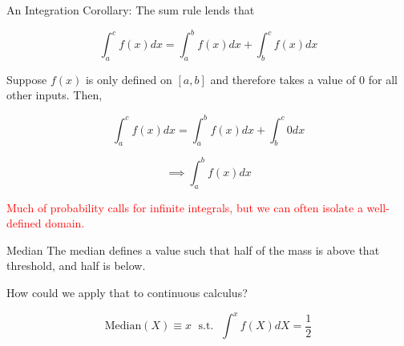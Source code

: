 \documentclass[10pt]{beamer}
\begin{document}
\begin{frame}{An Integration Corollary:}
    The sum rule lends that

    \[\int_a^c f(x)dx = \int_a^b f(x) dx + \int_b^c f(x) dx\]

    Suppose $f(x)$ is only defined on $[a,b]$ and therefore takes a value of $0$ for all other inputs. Then,

    \[\int_a^c f(x)dx = \int_a^b f(x)dx + \int_b^c 0dx\]

    \[\implies \int_a^b f(x)dx\]

    \pause \textcolor{red}{Much of probability calls for infinite integrals, but we can often isolate a well-defined domain.}
\end{frame}

\begin{frame}{Median}
    The median defines a value such that half of the mass is above that threshold, and half is below. \\

    \vspace{.5cm}

    How could we apply that to continuous calculus? \pause

    \[\text{Median}(X) \equiv x \; \text{ s.t. } \; \int^x f(X)dX = \frac{1}{2}\]
\end{frame}
\end{document}
